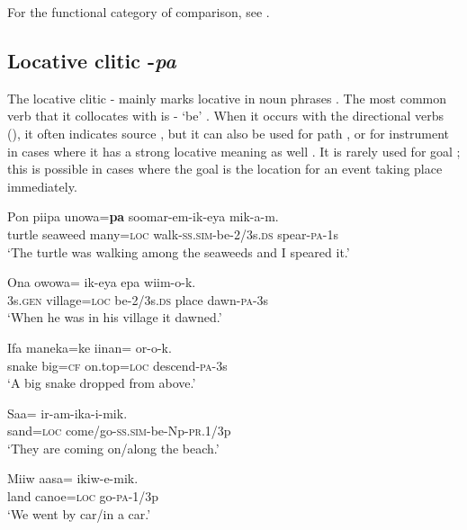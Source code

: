 \noindent For the functional category of comparison, see .

\subsection{Locative clitic -\textit{pa}}\label{sec:3.12.4}
{}
The locative clitic - mainly marks locative in noun phrases . The most common verb that it collocates with is - `be' . When it occurs with the directional verbs (), it often indicates source , but it can also be used for path , or for instrument in cases where it has a strong locative meaning as well . It is rarely used for goal ; this is possible in cases where the goal is the location for an event taking place immediately.

\ea%
\label{ex:3:x762}
\gll Pon piipa unowa=\textbf{pa} soomar-em-ik-eya mik-a-m. \\
turtle seaweed many=\textsc{loc} walk-\textsc{ss}.\textsc{sim}-be-2/3s.\textsc{ds} spear-\textsc{pa}-1s\\
\glt`The turtle was walking among the seaweeds and I speared it.'
\z

\ea%
\label{ex:3:x1880}
\gll Ona owowa= ik-eya epa wiim-o-k. \\
3s.\textsc{gen} village=\textsc{loc} be-2/3s.\textsc{ds} place dawn-\textsc{pa}-3s\\
\glt`When he was in his village it dawned.'
\z

\ea%
\label{ex:3:x1877}
\gll Ifa maneka=ke iinan= or-o-k. \\
snake big=\textsc{cf} on.top=\textsc{loc} descend-\textsc{pa}-3s\\
\glt`A big snake dropped from above.'
\z

\ea%
\label{ex:3:x770}
\gll Saa= ir-am-ika-i-mik. \\
sand=\textsc{loc} come/go-\textsc{ss}.\textsc{sim}-be-Np-\textsc{pr}.1/3p\\
\glt`They are coming on/along the beach.'
\z

\ea%
\label{ex:3:x771}
\gll Miiw aasa= ikiw-e-mik. \\
land canoe=\textsc{loc} go-\textsc{pa}-1/3p\\
\glt`We went by car/in a car.'
\z

